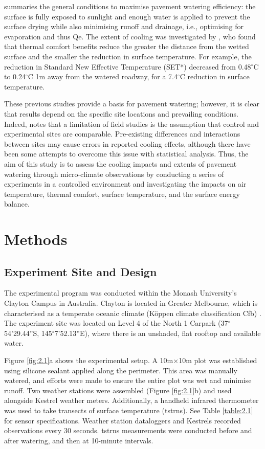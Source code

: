 \documentclass[final,3p,times,authoryear]{elsarticle}
\begin{document}
\cite{Hendel2020} summaries the general conditions to maximise pavement watering efficiency: the surface is fully exposed to sunlight and enough water is applied to prevent the surface drying while also minimising runoff and drainage, i.e., optimising for evaporation and thus \gls{Qe}. The extent of cooling was investigated by \cite{Takebayashi2021}, who found that thermal comfort benefits reduce the greater the distance from the wetted surface and the smaller the reduction in surface temperature. For example, the reduction in Standard New Effective Temperature (SET*) decreased from 0.48$^{\circ}$C to 0.24$^{\circ}$C 1m away from the watered roadway, for a 7.4$^{\circ}$C reduction in surface temperature. 

These previous studies provide a basis for pavement watering; however, it is clear that results depend on the specific site locations and prevailing conditions. Indeed, \cite{Hendel2016} notes that a limitation of field studies is the assumption that control and experimental sites are comparable. Pre-existing differences and interactions between sites may cause errors in reported cooling effects, although there have been some attempts to overcome this issue with statistical analysis. Thus, the aim of this study is to assess the cooling impacts and extents of pavement watering through micro-climate observations by conducting a series of experiments in a controlled environment and investigating the impacts on air temperature, thermal comfort, surface temperature, and the surface energy balance. 




\section{Methods}\label{sec:methods2}
\subsection{Experiment Site and Design}\label{sec:methods2.1}

The experimental program was conducted within the Monash University's Clayton Campus in Australia. Clayton is located in Greater Melbourne, which is characterised as a temperate oceanic climate (K\"{o}ppen climate classification Cfb) \citep{Beck2018}. The experiment site was located on Level 4 of the North 1 Carpark (37$^{\circ}$54'29.44''S, 145$^{\circ}$7'52.13''E), where there is an unshaded, flat rooftop and available water.

Figure \ref{fig:2.1}a shows the experimental setup. A 10m$\times$10m plot was established using silicone sealant applied along the perimeter. This area was manually watered, and efforts were made to ensure the entire plot was wet and minimise runoff. Two weather stations were assembled (Figure \ref{fig:2.1}b) and used alongside Kestrel weather meters. Additionally, a handheld infrared thermometer was used to take transects of surface temperature (\gls{tstrns}). See Table \ref{table:2.1} for sensor specifications. Weather station dataloggers and Kestrels recorded observations every 30 seconds. \gls{tstrns} measurements were conducted before and after watering, and then at 10-minute intervals.
\end{document}
